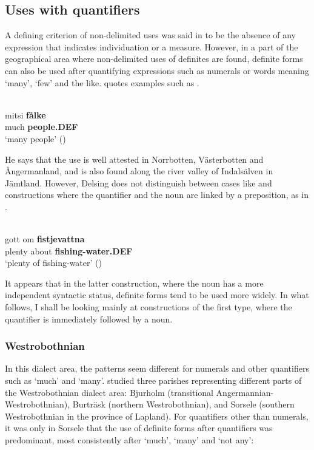 \subsection{ Uses with quantifiers}
\label{bkm:Ref114303795}

A defining criterion of non-delimited uses was said in  to be the absence of any expression that indicates individuation or a measure. However, in a part of the geographical area where non-delimited uses of definites are found, definite forms can also be used after quantifying expressions such as numerals or words meaning ‘many’, ‘few’ and the like. \citet{Delsing2003a} quotes examples such as .

\ea \label{} 
\\
\gll mitsi  \textbf{fålke}\\
much  \textbf{people.DEF}\\
\glt ‘many people’ (\citet[17]{Delsing2003a})

\z

He says that the use is well attested in Norrbotten, Västerbotten and Ångermanland, and is also found along the river valley of Indalsälven in Jämtland. However, Delsing does not distinguish between cases like  and constructions where the quantifier and the noun are linked by a preposition, as in .

\ea \label{} 
\\
\gll gott  om  \textbf{fistjevattna} \\
plenty  about  \textbf{fishing-water.DEF} \\
\glt ‘plenty of fishing-water’ (\citet[18]{Delsing2003a})

\z

It appears that in the latter construction, where the noun has a more independent syntactic status, definite forms tend to be used more widely. In what follows, I shall be looking mainly at constructions of the first type, where the quantifier is immediately followed by a noun. 

\subsubsection{Westrobothnian}
 In this dialect area, the patterns seem different for numerals and other quantifiers such as ‘much’ and ‘many’. \citet{BergholmEtAl1999} studied three parishes representing different parts of the Westrobothnian dialect area: Bjurholm (transitional Angermannian-Westrobothnian), Burträsk (northern Westrobothnian), and Sorsele (southern Westrobothnian in the province of Lapland). For quantifiers other than numerals, it was only in Sorsele that the use of definite forms after quantifiers was predominant, most consistently after ‘much’, ‘many’ and ‘not any’:

